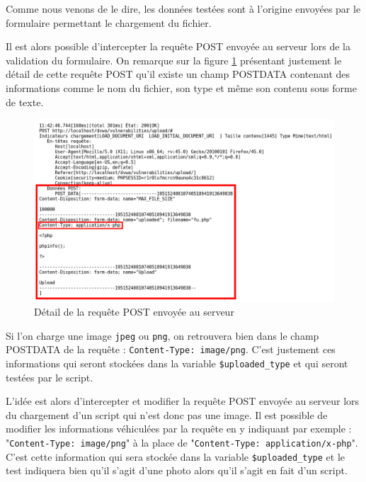 Comme nous venons de le dire, les données testées sont à l'origine envoyées par le formulaire permettant le chargement du fichier.

Il est alors possible d'intercepter la requête POST envoyée au serveur lors de la validation du formulaire. On remarque sur la figure \ref{fu_dvwa3} présentant justement le détail de cette requête POST qu'il existe un champ POSTDATA contenant des informations comme le nom du fichier, son type et même son contenu sous forme de texte.

\begin{figure}[!h]
\begin{center}
\includegraphics[scale=.45]{images/fu3.png}

\caption{Détail de la requête POST envoyée au serveur}
\label{fu_dvwa3}
\end{center}
\end{figure}

Si l'on charge une image \texttt{jpeg} ou \texttt{png}, on retrouvera bien dans le champ POSTDATA de la requête : \texttt{Content-Type: image/png}. C'est justement ces informations qui seront stockées dans la variable \texttt{\$uploaded\_type} et qui seront testées par le script.

L'idée est alors d'intercepter et modifier la requête POST envoyée au serveur lors du chargement d'un script qui n'est donc pas une image. Il est possible de modifier les informations véhiculées par la requête en y indiquant par exemple : "\texttt{Content-Type: image/png}" à la place de "\texttt{Content-Type: application/x-php}". C'est cette information qui sera stockée dans la variable \texttt{\$uploaded\_type} et le test indiquera bien qu'il s'agit d'une photo alors qu'il s'agit en fait d'un script.

